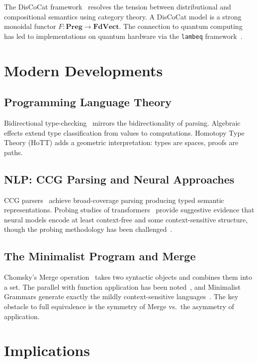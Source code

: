 \documentclass[12pt,a4paper]{article}
\begin{document}
The DisCoCat framework~\cite{CoeckeSadrzadehClark2010} resolves the tension
between distributional and compositional semantics using category theory. A
DisCoCat model is a strong monoidal functor $F \colon \mathbf{Preg} \to
\mathbf{FdVect}$. The connection to quantum computing has led to
implementations on quantum hardware via the \texttt{lambeq}
framework~\cite{Kartsaklis2021}.

\section{Modern Developments}

\subsection{Programming Language Theory}

Bidirectional type-checking~\cite{DunfieldKrishnaswami2021} mirrors the
bidirectionality of parsing. Algebraic effects extend type classification from
values to computations. Homotopy Type Theory (HoTT) adds a geometric
interpretation: types are spaces, proofs are paths.

\subsection{NLP: CCG Parsing and Neural Approaches}

CCG parsers~\cite{ClarkCurran2007,LewisSteedman2014} achieve broad-coverage
parsing producing typed semantic representations. Probing studies of
transformers~\cite{HewittManning2019,Clark2019,Jawahar2019} provide
suggestive evidence that neural models encode at least context-free and some
context-sensitive structure, though the probing methodology has been
challenged~\cite{HewittLiang2019}.

\subsection{The Minimalist Program and Merge}

Chomsky's Merge operation~\cite{Chomsky1995,Chomsky2000} takes two syntactic
objects and combines them into a set. The parallel with function application
has been noted~\cite{Collins2002,Stabler2011}, and Minimalist Grammars
generate exactly the mildly context-sensitive
languages~\cite{Stabler1997,Stabler2011}. The key obstacle to full
equivalence is the symmetry of Merge vs.\ the asymmetry of application.

\section{Implications}
\end{document}
